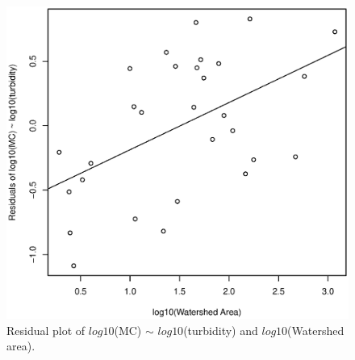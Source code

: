 
\begin{figure}
	\includegraphics[width=\textwidth]{figures/residual}
	\caption{Residual plot of $log10$(MC) $\sim$ $log10$(turbidity) and $log10$(Watershed area).}
	\label{fig:residuals}
\end{figure}


